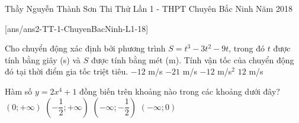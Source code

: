 
\begin{name}
{Thầy Nguyễn Thành Sơn}
{Thi Thử Lần 1 - THPT Chuyên Bắc Ninh Năm 2018}
\end{name}
\setcounter{ex}{0}
[ans/ans2-TT-1-ChuyenBacNinh-L1-18]
\begin{ex}  %
	Cho chuyển động xác định bởi phương trình $S=t^3-3t^2-9t$, trong đó $t$ được tính bằng giây (s) và $S$ được tính bằng mét (m). Tính vận tốc của chuyển động đó tại thời điểm gia tốc triệt tiêu.
	\choice
	{\True $-12$ m/s}
	{$-21$ m/s}
	{$-12$ m/s$^2$}
	{$12$ m/s}
\end{ex}
\begin{ex}  %
	Hàm số $y=2x^4+1$ đồng biến trên khoảng nào trong các khoảng dưới đây?
	\choice
	{\True  $\left( 0;+\infty \right)$}
	{$\left( -\dfrac{1}{2};+\infty \right)$}
	{$\left( -\infty;-\dfrac{1}{2} \right)$}
	{$\left( -\infty;0 \right)$}
\end{ex}
